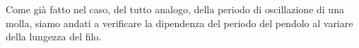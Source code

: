 Come già fatto nel caso, del tutto analogo, della
periodo di oscillazione di una molla, siamo andati a verificare la dipendenza
del periodo del pendolo al variare della lungezza del filo.
